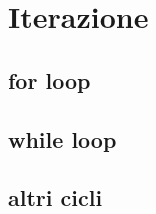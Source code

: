 \documentclass[letterpaper,10pt,english]{jupyterBook}
\begin{document}
\section{Iterazione}
\label{\detokenize{ch/programming/flow_control:iterazione}}

\subsection{for loop}
\label{\detokenize{ch/programming/flow_control:for-loop}}

\subsection{while loop}
\label{\detokenize{ch/programming/flow_control:while-loop}}

\subsection{altri cicli}
\label{\detokenize{ch/programming/flow_control:altri-cicli}}
\sphinxstepscope
\end{document}
